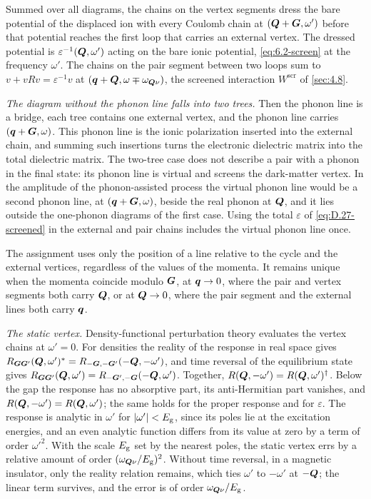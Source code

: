 Summed over all diagrams, the chains on the vertex segments dress the bare potential of the displaced ion with every Coulomb chain at $(\bm{Q} + \bm{G}, \omega')$ before that potential reaches the first loop that carries an external vertex. The dressed potential is $\varepsilon^{-1}(\bm{Q},\omega')$ acting on the bare ionic potential, \cref{eq:6.2-screen} at the frequency $\omega'$. The chains on the pair segment between two loops sum to $v + vRv = \varepsilon^{-1}v$ at $(\bm{q} + \bm{Q}, \omega \mp \omega_{\bm{Q}\nu})$, the screened interaction $W^{\mathrm{scr}}$ of \cref{sec:4.8}.

\emph{The diagram without the phonon line falls into two trees.} Then the phonon line is a bridge, each tree contains one external vertex, and the phonon line carries $(\bm{q} + \bm{G}, \omega)$. This phonon line is the ionic polarization inserted into the external chain, and summing such insertions turns the electronic dielectric matrix into the total dielectric matrix. The two-tree case does not describe a pair with a phonon in the final state: its phonon line is virtual and screens the dark-matter vertex. In the amplitude of the phonon-assisted process the virtual phonon line would be a second phonon line, at $(\bm{q} + \bm{G}, \omega)$, beside the real phonon at $\bm{Q}$, and it lies outside the one-phonon diagrams of the first case. Using the total $\varepsilon$ of \cref{eq:D.27-screened} in the external and pair chains includes the virtual phonon line once.

The assignment uses only the position of a line relative to the cycle and the external vertices, regardless of the values of the momenta. It remains unique when the momenta coincide modulo $\bm{G}$, at $\bm{q} \to 0$, where the pair and vertex segments both carry $\bm{Q}$, or at $\bm{Q} \to 0$, where the pair segment and the external lines both carry $\bm{q}$.

\emph{The static vertex.} Density-functional perturbation theory evaluates the vertex chains at $\omega' = 0$. For densities the reality of the response in real space gives $R_{\bm{G}\bm{G}'}(\bm{Q},\omega')^* = R_{-\bm{G},-\bm{G}'}(-\bm{Q},-\omega')$, and time reversal of the equilibrium state gives $R_{\bm{G}\bm{G}'}(\bm{Q},\omega') = R_{-\bm{G}',-\bm{G}}(-\bm{Q},\omega')$. Together, $R(\bm{Q},-\omega') = R(\bm{Q},\omega')^\dagger$. Below the gap the response has no absorptive part, its anti-Hermitian part vanishes, and $R(\bm{Q},-\omega') = R(\bm{Q},\omega')$; the same holds for the proper response and for $\varepsilon$. The response is analytic in $\omega'$ for $|\omega'| < E_{\mathrm{g}}$, since its poles lie at the excitation energies, and an even analytic function differs from its value at zero by a term of order $\omega'^2$. With the scale $E_{\mathrm{g}}$ set by the nearest poles, the static vertex errs by a relative amount of order $(\omega_{\bm{Q}\nu}/E_{\mathrm{g}})^2$. Without time reversal, in a magnetic insulator, only the reality relation remains, which ties $\omega'$ to $-\omega'$ at $-\bm{Q}$; the linear term survives, and the error is of order $\omega_{\bm{Q}\nu}/E_{\mathrm{g}}$.
